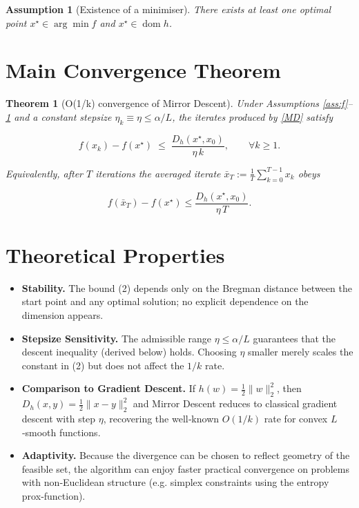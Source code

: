 \documentclass{article}
\newtheorem{theorem}{Theorem}
\newtheorem{assumption}{Assumption}
\newcommand{\DD}[2]{D_{h}(#1,#2)}
\begin{document}
\begin{assumption}[Existence of a minimiser]\label{ass:opt}
There exists at least one optimal point $x^{\star}\in\arg\min f$ and
$x^{\star}\in\operatorname{dom}h$.
\end{assumption}

\section*{Main Convergence Theorem}
\begin{theorem}[O(1/k) convergence of Mirror Descent]\label{thm:rate}
Under Assumptions \ref{ass:f}–\ref{ass:opt} and a constant stepsize
\(\eta_k\equiv\eta\le\alpha/L\), the iterates produced by \eqref{MD} satisfy  

\[
f(x_{k})-f(x^{\star})
\;\le\;
\frac{\DD{x^{\star}}{x_{0}}}{\eta\,k},
\qquad\forall k\ge 1.
\tag{2}
\]

Equivalently, after $T$ iterations the averaged iterate
\(\bar x_T:=\frac1T\sum_{k=0}^{T-1}x_k\) obeys  

\[
f(\bar x_T)-f(x^{\star})\le\frac{\DD{x^{\star}}{x_{0}}}{\eta\,T}.
\tag{3}
\]
\end{theorem}

\section*{Theoretical Properties}
\begin{itemize}
\item \textbf{Stability.} The bound (2) depends only on the Bregman distance
between the start point and any optimal solution; no explicit dependence on the
dimension appears.
\item \textbf{Stepsize Sensitivity.} The admissible range
\(\eta\le\alpha/L\) guarantees that the descent inequality (derived below)
holds. Choosing $\eta$ smaller merely scales the constant in (2) but does not
affect the $1/k$ rate.
\item \textbf{Comparison to Gradient Descent.}
If $h(w)=\tfrac12\|w\|_2^{2}$, then $\DD{x}{y}=\tfrac12\|x-y\|_2^{2}$ and
Mirror Descent reduces to classical gradient descent with step $\eta$,
recovering the well‑known $O(1/k)$ rate for convex $L$‑smooth functions.
\item \textbf{Adaptivity.}
Because the divergence can be chosen to reflect geometry of the feasible set,
the algorithm can enjoy faster practical convergence on problems with
non‑Euclidean structure (e.g. simplex constraints using the entropy prox‑function).
\end{itemize}
\end{document}
